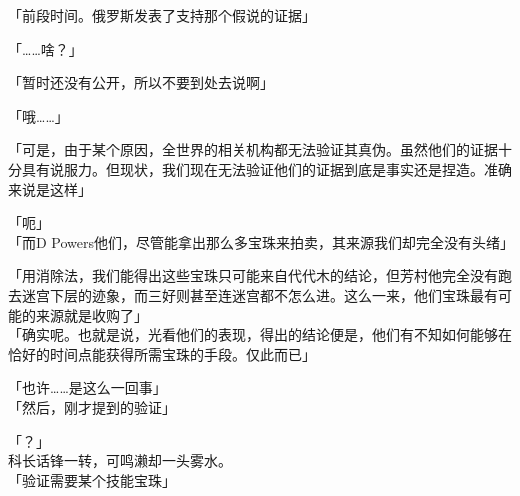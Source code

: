 「前段时间。俄罗斯发表了支持那个假说的证据」

「……啥？」

「暂时还没有公开，所以不要到处去说啊」

「哦……」

「可是，由于某个原因，全世界的相关机构都无法验证其真伪。虽然他们的证据十分具有说服力。但现状，我们现在无法验证他们的证据到底是事实还是捏造。准确来说是这样」

「呃」\\

「而D Powers他们，尽管能拿出那么多宝珠来拍卖，其来源我们却完全没有头绪」

「用消除法，我们能得出这些宝珠只可能来自代代木的结论，但芳村他完全没有跑去迷宫下层的迹象，而三好则甚至连迷宫都不怎么进。这么一来，他们宝珠最有可能的来源就是收购了」\\

「确实呢。也就是说，光看他们的表现，得出的结论便是，他们有不知如何能够在恰好的时间点能获得所需宝珠的手段。仅此而已」

「也许……是这么一回事」\\

「然后，刚才提到的验证」

「？」\\

科长话锋一转，可鸣濑却一头雾水。\\

「验证需要某个技能宝珠」

